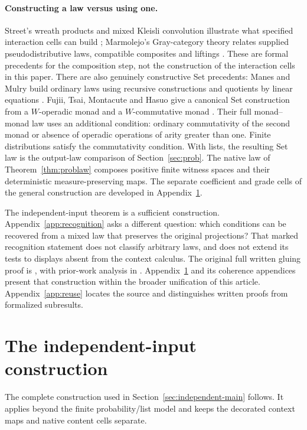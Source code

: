 \documentclass[11pt]{article}
\numberwithin{equation}{section}
\theoremstyle{definition}\newtheorem{definition}[theorem]{Definition}
\begin{document}
\paragraph{Constructing a law versus using one.}
Street's wreath products and mixed Kleisli convolution illustrate what
specified interaction cells can build \cite[Secs.~2--3]{street};
Marmolejo's Gray-category theory relates supplied pseudodistributive
laws, compatible composites and liftings \cite{marmolejo}. These are
formal precedents for the composition step, not the construction of
the interaction cells in this paper. There are also genuinely
constructive Set precedents: Manes and Mulry build ordinary laws using
recursive constructions and quotients by linear equations \cite{manes}.
Fujii, Tsai, Montacute and Hasuo give a canonical Set construction from
a $W$-operadic monad and a $W$-commutative monad
\cite[Thm.~42 and Rem.~43]{fujii}. Their full monad--monad law uses an
additional condition: ordinary commutativity of the second monad or
absence of operadic operations of arity greater than one. Finite
distributions satisfy the commutativity condition. With lists, the
resulting Set law is the output-law comparison of Section~\ref{sec:prob}.
The native law of Theorem~\ref{thm:problaw} composes positive finite
witness spaces and their deterministic measure-preserving maps. The
separate coefficient and grade cells of the general construction are
developed in Appendix~\ref{app:construction}.

The independent-input theorem is a sufficient construction. Appendix~\ref{app:recognition}
asks a different question: which conditions can be recovered from a mixed
law that preserves the original projections? That marked recognition
statement does not classify arbitrary laws, and does not extend its tests
to displays absent from the context calculus. The original full written gluing proof is \cite{Gluing}, with prior-work
analysis in \cite{Comparison}. Appendix~\ref{app:construction} and its
coherence appendices present that construction within the broader
unification of this article. Appendix~\ref{app:reuse} locates the source
and distinguishes written proofs from formalized subresults.

\section{The independent-input construction}\label{app:construction}
The complete construction used in Section~\ref{sec:independent-main} follows. It applies beyond the finite probability/list model and keeps the decorated context maps and native content cells separate.
\end{document}
